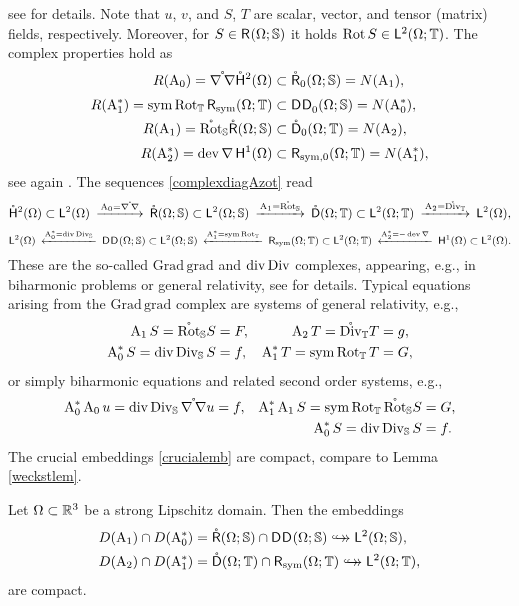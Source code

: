 \documentclass[a4paper]{amsart}
\newcommand{\htc}{\mathring\hsymbol^2}
\renewcommand{\rc}{\mathring\rsymbol}
\renewcommand{\dc}{\mathring\dsymbol}
\DeclareMathOperator{\Az}{A_{0}}
\DeclareMathOperator{\Azs}{A_{0}^{*}}
\DeclareMathOperator{\Ao}{A_{1}}
\DeclareMathOperator{\Aos}{A_{1}^{*}}
\DeclareMathOperator{\At}{A_{2}}
\DeclareMathOperator{\Ats}{A_{2}^{*}}
\newcommand{\grad}{\na}
\newcommand{\cptemb}{\hookto\hspace*{-0.85em}\hookto}
\newcommand{\bbS}{\mathbb{S}}
\newcommand{\bbT}{\mathbb{T}}
\begin{document}
see \cite{paulyzulehnerbiharmonic} for details.
Note that $u$, $v$, and $S$, $T$ are scalar, vector, and tensor (matrix) fields, respectively.
Moreover, for $S\in\r(\om;\bbS)$ it holds $\Rot S\in\lt(\om;\bbT)$.
The complex properties hold as
\begin{align*}
R(\Az)=\mathring{\na\na}\htc(\om)&\subset\rc_{0}(\om;\bbS)=N(\Ao),\\
R(\Aos)=\sym\Rot_{\bbT}\rsymbol_{\sym}(\om;\bbT)&\subset\d\dz(\om;\bbS)=N(\Azs),\\
R(\Ao)=\mathring{\Rot}_{\bbS}\rc(\om;\bbS)&\subset\dc_{0}(\om;\bbT)=N(\At),\\
R(\Ats)=\dev\grad\hoom&\subset\rsymbol_{\sym,0}(\om;\bbT)=N(\Aos),
\end{align*}
see again \cite{paulyzulehnerbiharmonic}.
The sequences \eqref{complexdiagAzot} read
$$\small\begin{CD}
\htc(\om)\subset\ltom @> \A_{0}=\mathring{\na\na} >>
\rc(\om;\bbS)\subset\lt(\om;\bbS) @> \A_{1}=\mathring{\Rot}_{\bbS} >>
\dc(\om;\bbT)\subset\lt(\om;\bbT) @> \A_{2}=\mathring{\Div}_{\bbT} >>
\ltom,
\end{CD}$$
$$\small\begin{CD}
\ltom @< \A_{0}^{*}=\div\Div_{\bbS} <<
\d\d(\om;\bbS)\subset\lt(\om;\bbS) @< \A_{1}^{*}=\sym\Rot_{\bbT} <<
\rsymbol_{\sym}(\om;\bbT)\subset\lt(\om;\bbT) @< \A_{2}^{*}=-\dev\grad <<
\hoom\subset\ltom.
\end{CD}$$
These are the so-called $\mathrm{Grad}\,\mathrm{grad}$ and $\operatorname{div}\operatorname{Div}$ complexes, appearing, e.g., 
in biharmonic problems or general relativity, see \cite{paulyzulehnerbiharmonic} for details.
Typical equations arising from the $\mathrm{Grad}\,\mathrm{grad}$ complex are
systems of general relativity, e.g.,
\begin{align*}
\A_{1}S=\mathring{\Rot}_{\bbS}S&=F,
&
\A_{2}T=\mathring{\Div}_{\bbT}T&=g,\\
\A_{0}^{*}S=\div\Div_{\bbS}S&=f,
&
\A_{1}^{*}T=\sym\Rot_{\bbT}T&=G,
\end{align*}
or simply biharmonic equations and related second order systems, e.g.,
\begin{align*}
\A_{0}^{*}\A_{0}u=\div\Div_{\bbS}\mathring{\na\na}u&=f,
&
\A_{1}^{*}\A_{1}S=\sym\Rot_{\bbT}\mathring{\Rot}_{\bbS}S&=G,\\
&&
\A_{0}^{*}S=\div\Div_{\bbS}S&=f.
\end{align*}
The crucial embeddings \eqref{crucialemb}
are compact, compare to Lemma \ref{weckstlem}.

\begin{lem}
\label{biharmstlem}
Let $\Omega\subset\mathbb{R}^{3}$ be a strong Lipschitz domain.
Then the embeddings
\begin{align*}
D(\Ao)\cap D(\Azs)&=\rc(\om;\bbS)\cap\d\d(\om;\bbS)\cptemb\lt(\om;\bbS),\\
D(\At)\cap D(\Aos)&=\dc(\om;\bbT)\cap\rsymbol_{\sym}(\om;\bbT)\cptemb\lt(\om;\bbT),
\end{align*}
are compact.
\end{lem}
\end{document}
